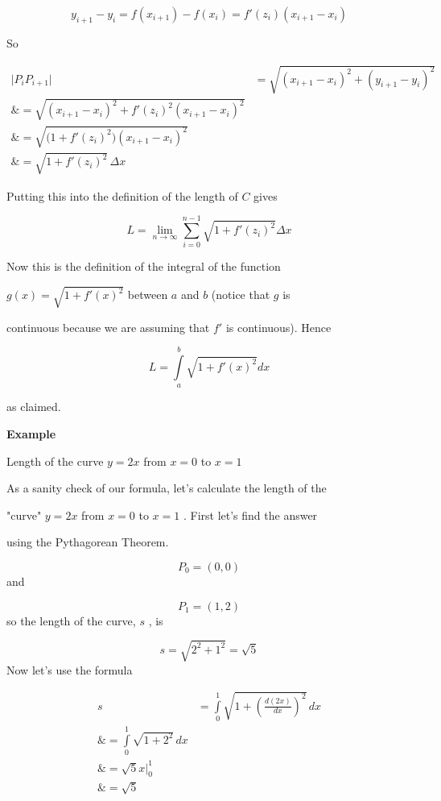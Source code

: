 $$y _{i+1}-y _i=f(x _{i+1})-f(x _i)=f'(z _i)(x _{i+1}-x _i)$$



So



\begin{align}
\bigl|P _iP _{i+1}\bigr| &= \sqrt{(x _{i+1} - x _i)^2 + (y _{i+1} - y _i)^2} \\\&= \sqrt{(x _{i+1} - x _i)^2 + f'(z _i)^2(x _{i+1} - x _i)^2} \\\&= \sqrt{\bigl(1 + f'(z _i)^2\bigr)(x _{i+1} - x _i)^2} \\\&= \sqrt{1 + f'(z _i)^2} \,\Delta x
\end{align}



Putting this into the definition of the length of $C$ gives



$$L=\lim _{n\to\infty}\sum _{i=0}^{n-1}\sqrt{1+f'(z _i)^2}\Delta x$$



Now this is the definition of the integral of the function

$g(x)=\sqrt{1+f'(x)^2}$ between $a$ and $b$ (notice that $g$ is

continuous because we are assuming that $f'$ is continuous). Hence



$$L=\int\limits _a^b \sqrt{1+f'(x)^2}dx$$



as claimed.



\textbf{Example}



Length of the curve $y=2x$ from $x=0$ to $x=1$



As a sanity check of our formula, let's calculate the length of the

"curve" $y=2x$ from $x=0$ to $x=1$ . First let's find the answer

using the Pythagorean Theorem.



$$P _0=(0,0)$$ and



$$P _1=(1,2)$$ so the length of the curve, $s$ , is



$$s=\sqrt{2^2+1^2}=\sqrt5$$ Now let's use the formula



\begin{align}
s &= \int\limits _0^1 \sqrt{1+\left(\tfrac{d(2x)}{dx}\right)^2}\,dx \\\&= \int\limits _0^1 \sqrt{1+2^2}\,dx \\\&= \sqrt{5}x\bigg| _0^1 \\\&= \sqrt{5}
\end{align}




